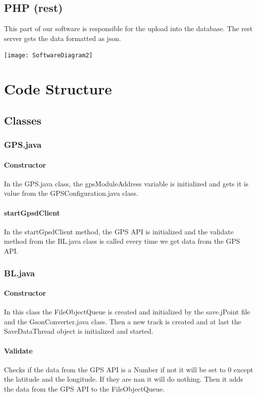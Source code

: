 \subsection{PHP (\gls{rest})}
This part of our software is responsible for the upload into the database. The \gls{rest} server gets the data formatted as \gls{json}.
\begin{center}
\texttt{[image: SoftwareDiagram2]}
\end{center} 
\section{Code Structure}
\subsection{Classes}
\subsubsection{GPS.java}
\paragraph{Constructor}
In the GPS.java class, the gpsModuleAddress variable is initialized and gets it is value from the GPSConfiguration.java class.
\paragraph{startGpsdClient}
In the startGpsdClient method, the GPS API is initialized and the validate method from the BL.java class is called every time we get data from the GPS API.
\subsubsection{BL.java}
\paragraph{Constructor}
In this class the FileObjectQueue is created and initialized by the save.jPoint file and the GsonConverter.java class. 
Then a new track is created and at last the SaveDataThread object is initialized and started.
\paragraph{Validate}
Checks if the data from the GPS API is a Number if not it will be set to 0 except the latitude and the longitude. If they are \gls{nan} it will do nothing. 
Then it adds the data from the GPS API to the FileObjectQueue.
